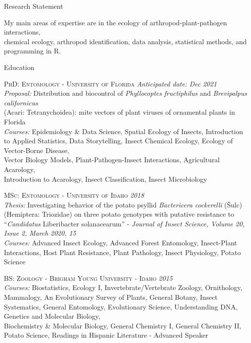 \documentclass{resume} %
\begin{document}
\begin{rSection}{Research Statement}

My main areas of expertise are in the ecology of arthropod-plant-pathogen interactions,\\ chemical ecology, arthropod identification, data analysis, statistical methods, and\\ programming in R.

\end{rSection}

\begin{rSection}{Education}
	
	\textsc{PhD: Entomology - University of Florida} \hfill {\em Anticipated date: Dec 2021}\\
	\textit{Proposal:} Distribution and biocontrol of \textit{Phyllocoptes fructiphilus} and \textit{Brevipalpus californicus}\\ (Acari: Tetranychoidea): mite vectors of plant viruses of ornamental plants in Florida \\
	\textit{Courses:} Epidemiology \& Data Science, Spatial Ecology of Insects, Introduction to Applied Statistics, Data Storytelling, Insect Chemical Ecology, Ecology of Vector-Borne Disease,\\
	Vector Biology Models, Plant-Pathogen-Insect Interactions, Agricultural Acarology,\\
	Introduction to Acarology, Insect Classification, Insect Microbiology\\ \hfill
	
	\textsc{MSc: Entomology - University of Idaho} \hfill {\em 2018}\\
	\textit{Thesis:} Investigating behavior of the potato psyllid \textit{Bactericera cockerelli} (Šulc) (Hemiptera: Triozidae) on three potato genotypes with putative resistance to “\textit{Candidatus} Liberibacter solanacearum” - \textit{Journal of Insect Science, Volume 20, Issue 2, March 2020, 15}\\
	\textit{Courses:} Advanced Insect Ecology, Advanced Forest Entomology,
	Insect-Plant Interactions, Host Plant Resistance, Plant Pathology, Insect Physiology, Potato Science\\ \hfill
	
	\textsc{BS: Zoology - Brigham Young University - Idaho} \hfill {\em 2015}\\ \textit{Courses:} Biostatistics, Ecology I, Invertebrate/Vertebrate Zoology, Ornithology, Mammalogy, An Evolutionary Survey of Plants, General Botany, Insect Systematics, General Entomology, Evolutionary Science, Understanding DNA, Genetics and Molecular Biology,\\ Biochemistry \& Molecular Biology, General Chemistry I, General Chemistry II,\\ Potato Science, Readings in Hispanic Literature - Advanced Speaker\\ \hfill
	
\end{rSection}
\end{document}
